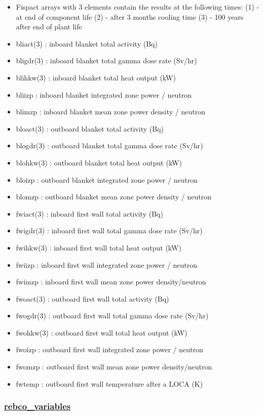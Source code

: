 \documentclass[]{article}
\providecommand{\tightlist}{%
  \setlength{\itemsep}{0pt}\setlength{\parskip}{0pt}}
\begin{document}
\begin{itemize}
\tightlist
\item
  Fispact arrays with 3 elements contain the results at the following
  times: (1) - at end of component life (2) - after 3 months cooling
  time (3) - 100 years after end of plant life
\item
  bliact(3) : inboard blanket total activity (Bq)
\item
  bligdr(3) : inboard blanket total gamma dose rate (Sv/hr)
\item
  blihkw(3) : inboard blanket total heat output (kW)
\item
  bliizp : inboard blanket integrated zone power / neutron
\item
  blimzp : inboard blanket mean zone power density / neutron
\item
  bloact(3) : outboard blanket total activity (Bq)
\item
  blogdr(3) : outboard blanket total gamma dose rate (Sv/hr)
\item
  blohkw(3) : outboard blanket total heat output (kW)
\item
  bloizp : outboard blanket integrated zone power / neutron
\item
  blomzp : outboard blanket mean zone power density / neutron
\item
  fwiact(3) : inboard first wall total activity (Bq)
\item
  fwigdr(3) : inboard first wall total gamma dose rate (Sv/hr)
\item
  fwihkw(3) : inboard first wall total heat output (kW)
\item
  fwiizp : inboard first wall integrated zone power / neutron
\item
  fwimzp : inboard first wall mean zone power density/neutron
\item
  fwoact(3) : outboard first wall total activity (Bq)
\item
  fwogdr(3) : outboard first wall total gamma dose rate (Sv/hr)
\item
  fwohkw(3) : outboard first wall total heat output (kW)
\item
  fwoizp : outboard first wall integrated zone power / neutron
\item
  fwomzp : outboard first wall mean zone power density/neutron
\item
  fwtemp : outboard first wall temperature after a LOCA (K)
\end{itemize}

\subsubsection{\texorpdfstring{\href{rebco_variables.html}{rebco\_variables}}{rebco\_variables}}\label{rebco_variables}
\end{document}
